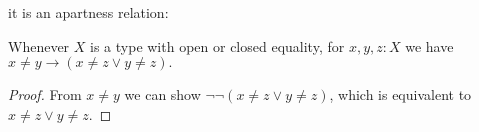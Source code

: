 it is an apartness relation:
\begin{lemma}\label{StoneEqualityApartness}
  Whenever $X$ is a type with open or closed equality, for $x,y,z:X$ we have 
%
    $
  x \neq y \to (x\neq z \vee y \neq z).
  $
\end{lemma}
\begin{proof}
  From $x\neq y$ %
  we can show $\neg \neg ( x \neq  z \vee y \neq  z)$, 
  which is equivalent to %
  $x\neq z \vee y \neq z$.%
\end{proof}
